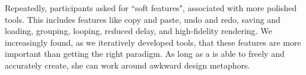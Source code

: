 
Repeatedly, participants asked for ``soft features", associated with more polished tools.
This includes features like copy and paste, undo and redo, saving and loading, grouping, looping, reduced delay, and high-fidelity rendering.
We increasingly found, as we iteratively developed \haxd tools, that these features are more important than getting the right paradigm.
As long as a  is able to freely and accurately create, she can work around awkward design metaphors.



%
%


